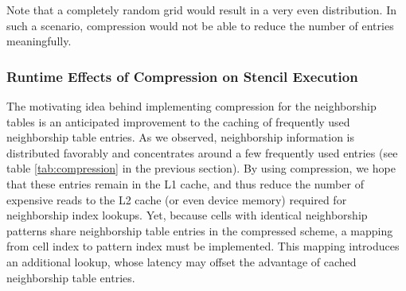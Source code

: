 Note that a completely random grid would result in a very even distribution. In such a scenario, compression would not be able to reduce the number of entries meaningfully. 

\subsubsection{Runtime Effects of Compression on Stencil Execution}

The motivating idea behind implementing compression for the neighborship tables is an anticipated improvement to the caching of frequently used neighborship table entries. As we observed, neighborship information is distributed favorably and concentrates around a few frequently used entries (see table \ref{tab:compression} in the previous section). By using compression, we hope that these entries remain in the L1 cache, and thus reduce the number of expensive reads to the L2 cache (or even device memory) required for neighborship index lookups. Yet, because cells with identical neighborship patterns share neighborship table entries in the compressed scheme, a mapping from cell index to pattern index must be implemented. This mapping introduces an additional lookup, whose latency may offset the advantage of cached neighborship table entries.

